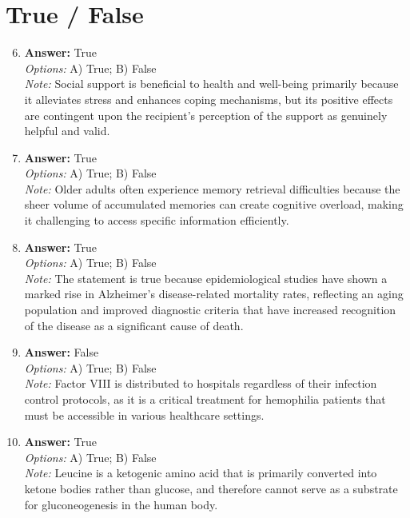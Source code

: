 \documentclass[12pt]{article}
\begin{document}
\section*{True / False}
\begin{enumerate}[label=\arabic*.]
\setcounter{enumi}{5}
\item \textbf{Answer:} True
\\ \textit{Options:} A) True; B) False
\\ \textit{Note:} Social support is beneficial to health and well-being primarily because it alleviates stress and enhances coping mechanisms, but its positive effects are contingent upon the recipient's perception of the support as genuinely helpful and valid.
\item \textbf{Answer:} True
\\ \textit{Options:} A) True; B) False
\\ \textit{Note:} Older adults often experience memory retrieval difficulties because the sheer volume of accumulated memories can create cognitive overload, making it challenging to access specific information efficiently.
\item \textbf{Answer:} True
\\ \textit{Options:} A) True; B) False
\\ \textit{Note:} The statement is true because epidemiological studies have shown a marked rise in Alzheimer's disease-related mortality rates, reflecting an aging population and improved diagnostic criteria that have increased recognition of the disease as a significant cause of death.
\item \textbf{Answer:} False
\\ \textit{Options:} A) True; B) False
\\ \textit{Note:} Factor VIII is distributed to hospitals regardless of their infection control protocols, as it is a critical treatment for hemophilia patients that must be accessible in various healthcare settings.
\item \textbf{Answer:} True
\\ \textit{Options:} A) True; B) False
\\ \textit{Note:} Leucine is a ketogenic amino acid that is primarily converted into ketone bodies rather than glucose, and therefore cannot serve as a substrate for gluconeogenesis in the human body.
\end{enumerate}
\end{document}
